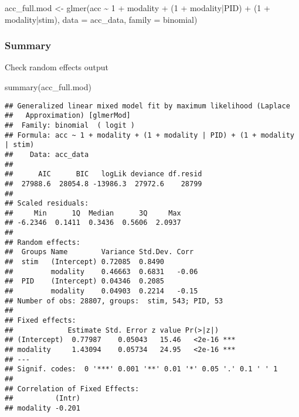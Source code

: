 \documentclass[
]{article}
\newenvironment{Shaded}{\begin{snugshade}}{\end{snugshade}}
\newcommand{\AttributeTok}[1]{\textcolor[rgb]{0.77,0.63,0.00}{#1}}
\newcommand{\DecValTok}[1]{\textcolor[rgb]{0.00,0.00,0.81}{#1}}
\newcommand{\FunctionTok}[1]{\textcolor[rgb]{0.00,0.00,0.00}{#1}}
\newcommand{\NormalTok}[1]{#1}
\newcommand{\OtherTok}[1]{\textcolor[rgb]{0.56,0.35,0.01}{#1}}
\newcommand{\SpecialCharTok}[1]{\textcolor[rgb]{0.00,0.00,0.00}{#1}}
\begin{document}
\begin{Shaded}
\begin{Highlighting}[]
\NormalTok{acc\_full.mod }\OtherTok{\textless{}{-}} \FunctionTok{glmer}\NormalTok{(acc }\SpecialCharTok{\textasciitilde{}} \DecValTok{1} \SpecialCharTok{+}\NormalTok{ modality }\SpecialCharTok{+} 
\NormalTok{                        (}\DecValTok{1} \SpecialCharTok{+}\NormalTok{ modality}\SpecialCharTok{|}\NormalTok{PID) }\SpecialCharTok{+}\NormalTok{ (}\DecValTok{1} \SpecialCharTok{+}\NormalTok{ modality}\SpecialCharTok{|}\NormalTok{stim), }
                      \AttributeTok{data =}\NormalTok{ acc\_data, }
                      \AttributeTok{family =}\NormalTok{ binomial)}
\end{Highlighting}
\end{Shaded}

\hypertarget{summary-2}{%
\subsubsection{Summary}\label{summary-2}}

Check random effects output

\begin{Shaded}
\begin{Highlighting}[]
\FunctionTok{summary}\NormalTok{(acc\_full.mod)}
\end{Highlighting}
\end{Shaded}

\begin{verbatim}
## Generalized linear mixed model fit by maximum likelihood (Laplace
##   Approximation) [glmerMod]
##  Family: binomial  ( logit )
## Formula: acc ~ 1 + modality + (1 + modality | PID) + (1 + modality | stim)
##    Data: acc_data
## 
##      AIC      BIC   logLik deviance df.resid 
##  27988.6  28054.8 -13986.3  27972.6    28799 
## 
## Scaled residuals: 
##     Min      1Q  Median      3Q     Max 
## -6.2346  0.1411  0.3436  0.5606  2.0937 
## 
## Random effects:
##  Groups Name        Variance Std.Dev. Corr 
##  stim   (Intercept) 0.72085  0.8490        
##         modality    0.46663  0.6831   -0.06
##  PID    (Intercept) 0.04346  0.2085        
##         modality    0.04903  0.2214   -0.15
## Number of obs: 28807, groups:  stim, 543; PID, 53
## 
## Fixed effects:
##             Estimate Std. Error z value Pr(>|z|)    
## (Intercept)  0.77987    0.05043   15.46   <2e-16 ***
## modality     1.43094    0.05734   24.95   <2e-16 ***
## ---
## Signif. codes:  0 '***' 0.001 '**' 0.01 '*' 0.05 '.' 0.1 ' ' 1
## 
## Correlation of Fixed Effects:
##          (Intr)
## modality -0.201
\end{verbatim}
\end{document}
